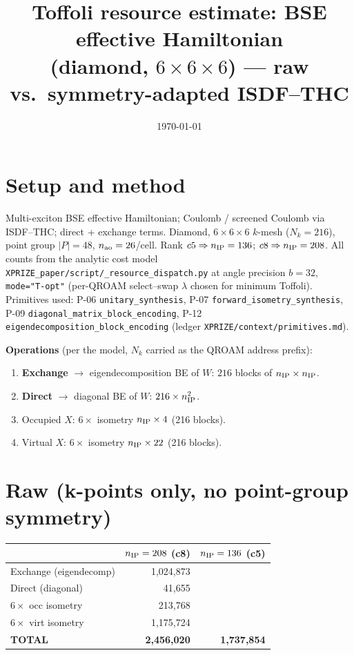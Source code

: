 \documentclass[11pt]{article}
\title{\vspace{-1.2cm}Toffoli resource estimate: BSE effective Hamiltonian\\[2pt]
(diamond, $6{\times}6{\times}6$) --- raw vs.\ symmetry-adapted ISDF--THC}
\author{}\date{\today}
\newcommand{\code}[1]{\texttt{\small #1}}
\begin{document}
\maketitle\vspace{-0.8cm}

\section*{Setup and method}
Multi-exciton BSE effective Hamiltonian; Coulomb / screened Coulomb via ISDF--THC; direct + exchange
terms. Diamond, $6{\times}6{\times}6$ $k$-mesh ($N_k=216$), point group $|P|=48$, $n_{\rm ao}=26$/cell.
Rank $c5\Rightarrow n_{\rm IP}=136$; $c8\Rightarrow n_{\rm IP}=208$.
All counts from the analytic cost model \code{XPRIZE\_paper/script/\_resource\_dispatch.py} at
angle precision $b=32$, \code{mode="T-opt"} (per-QROAM select--swap $\lambda$ chosen for minimum
Toffoli). Primitives used: P-06 \code{unitary\_synthesis}, P-07 \code{forward\_isometry\_synthesis},
P-09 \code{diagonal\_matrix\_block\_encoding}, P-12 \code{eigendecomposition\_block\_encoding}
(ledger \code{XPRIZE/context/primitives.md}).

\textbf{Operations} (per the model, $N_k$ carried as the QROAM address prefix):
\begin{enumerate}\itemsep0pt
\item \textbf{Exchange} $\to$ eigendecomposition BE of $W$: $216$ blocks of $n_{\rm IP}\times n_{\rm IP}$.
\item \textbf{Direct} $\to$ diagonal BE of $W$: $216\times n_{\rm IP}^2$.
\item Occupied $X$: $6\times$ isometry $n_{\rm IP}\times4$ (216 blocks).
\item Virtual $X$: $6\times$ isometry $n_{\rm IP}\times22$ (216 blocks).
\end{enumerate}

\section*{Raw (k-points only, no point-group symmetry)}
\begin{center}\begin{tabular}{lrr}
\toprule
 & $n_{\rm IP}=208$ (c8) & $n_{\rm IP}=136$ (c5)\\\midrule
Exchange (eigendecomp) & 1{,}024{,}873 & \\
Direct (diagonal) & 41{,}655 & \\
$6\times$ occ isometry & 213{,}768 & \\
$6\times$ virt isometry & 1{,}175{,}724 & \\
\textbf{TOTAL} & \textbf{2{,}456{,}020} & \textbf{1{,}737{,}854}\\
\bottomrule
\end{tabular}\end{center}
\end{document}
